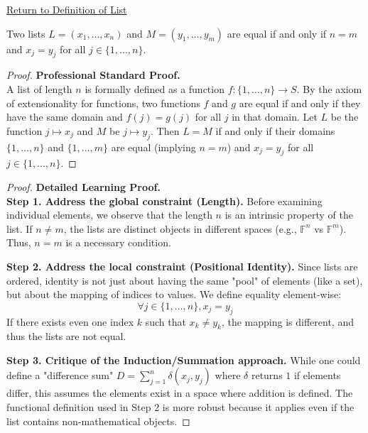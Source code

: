 \newpage
{}
\label{prf:list-equality}

\begin{remark*}[Return]
\hyperref[def:list]{Return to Definition of List}
\end{remark*}

\begin{theorem*}
Two lists $L = (x_1, \dots, x_n)$ and $M = (y_1, \dots, y_m)$ are equal if and only if $n = m$ and $x_j = y_j$ for all $j \in \{1, \dots, n\}$.
\end{theorem*}

\begin{proof}
\textbf{Professional Standard Proof.}~\\
A list of length $n$ is formally defined as a function $f: \{1, \dots, n\} \to S$. By the axiom of extensionality for functions, two functions $f$ and $g$ are equal if and only if they have the same domain and $f(j) = g(j)$ for all $j$ in that domain. Let $L$ be the function $j \mapsto x_j$ and $M$ be $j \mapsto y_j$. Then $L = M$ if and only if their domains $\{1, \dots, n\}$ and $\{1, \dots, m\}$ are equal (implying $n = m$) and $x_j = y_j$ for all $j \in \{1, \dots, n\}$.
\end{proof}

\begin{proof}
\textbf{Detailed Learning Proof.}~\\

\textbf{Step 1. Address the global constraint (Length).}
Before examining individual elements, we observe that the length $n$ is an intrinsic property of the list. If $n \neq m$, the lists are distinct objects in different spaces (e.g., $\mathbb{F}^n$ vs $\mathbb{F}^m$). Thus, $n=m$ is a necessary condition.

\textbf{Step 2. Address the local constraint (Positional Identity).}
Since lists are ordered, identity is not just about having the same "pool" of elements (like a set), but about the mapping of indices to values. We define equality element-wise:
\[ \forall j \in \{1, \dots, n\}, x_j = y_j \]
If there exists even one index $k$ such that $x_k \neq y_k$, the mapping is different, and thus the lists are not equal.

\textbf{Step 3. Critique of the Induction/Summation approach.}
While one could define a "difference sum" $D = \sum_{j=1}^n \delta(x_j, y_j)$ where $\delta$ returns $1$ if elements differ, this assumes the elements exist in a space where addition is defined. The functional definition used in Step 2 is more robust because it applies even if the list contains non-mathematical objects.
\end{proof}

